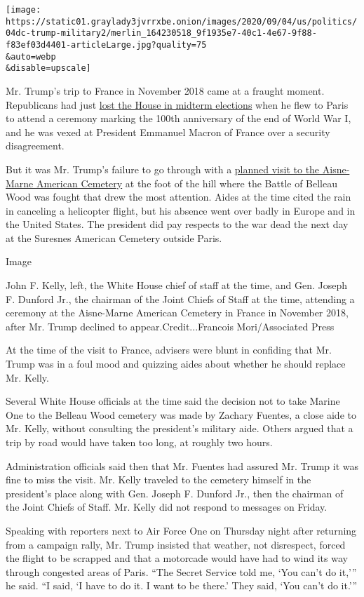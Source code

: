 \texttt{[image: https://static01.graylady3jvrrxbe.onion/images/2020/09/04/us/politics/04dc-trump-military2/merlin\_164230518\_9f1935e7-40c1-4e67-9f88-f83ef03d4401-articleLarge.jpg?quality=75\\\&auto=webp\\\&disable=upscale]}

Mr. Trump's trip to France in November 2018 came at a fraught moment.
Republicans had just
\href{https://www.nytimes3xbfgragh.onion/2018/11/06/us/politics/midterm-elections-results.html}{lost
the House in midterm elections} when he flew to Paris to attend a
ceremony marking the 100th anniversary of the end of World War I, and he
was vexed at President Emmanuel Macron of France over a security
disagreement.

But it was Mr. Trump's failure to go through with a
\href{https://www.abmc.gov/aisne-marne\#.W-WNEXpKg_U}{planned visit to
the Aisne-Marne American Cemetery} at the foot of the hill where the
Battle of Belleau Wood was fought that drew the most attention. Aides at
the time cited the rain in canceling a helicopter flight, but his
absence went over badly in Europe and in the United States. The
president did pay respects to the war dead the next day at the Suresnes
American Cemetery outside Paris.

Image

John F. Kelly, left, the White House chief of staff at the time, and
Gen. Joseph F. Dunford Jr., the chairman of the Joint Chiefs of Staff at
the time, attending a ceremony at the Aisne-Marne American Cemetery in
France in November 2018, after Mr. Trump declined to
appear.Credit...Francois Mori/Associated Press

At the time of the visit to France, advisers were blunt in confiding
that Mr. Trump was in a foul mood and quizzing aides about whether he
should replace Mr. Kelly.

Several White House officials at the time said the decision not to take
Marine One to the Belleau Wood cemetery was made by Zachary Fuentes, a
close aide to Mr. Kelly, without consulting the president's military
aide. Others argued that a trip by road would have taken too long, at
roughly two hours.

Administration officials said then that Mr. Fuentes had assured Mr.
Trump it was fine to miss the visit. Mr. Kelly traveled to the cemetery
himself in the president's place along with Gen. Joseph F. Dunford Jr.,
then the chairman of the Joint Chiefs of Staff. Mr. Kelly did not
respond to messages on Friday.

Speaking with reporters next to Air Force One on Thursday night after
returning from a campaign rally, Mr. Trump insisted that weather, not
disrespect, forced the flight to be scrapped and that a motorcade would
have had to wind its way through congested areas of Paris. ``The Secret
Service told me, `You can't do it,''' he said. ``I said, `I have to do
it. I want to be there.' They said, `You can't do it.'''

